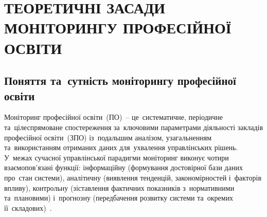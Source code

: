 %
%

\section{\texorpdfstring{\MakeUppercase{Теоретичні засади моніторингу професійної освіти}}{Теоретичні засади моніторингу професійної освіти}}
\label{sec:rozdil1}

\subsection{Поняття та~сутність моніторингу професійної освіти}
\label{sec:p1-theory}
\label{sec:p1-descriptive}

Моніторинг професійної освіти~(ПО)~-- це~систематичне, періодичне та~цілеспрямоване спостереження за~ключовими параметрами діяльності закладів професійної освіти~(ЗПО) із~подальшим аналізом, узагальненням та~використанням отриманих даних для~ухвалення управлінських рішень. У~межах сучасної управлінської парадигми моніторинг виконує чотири взаємопов'язані функції: інформаційну (формування достовірної бази даних про~стан системи), аналітичну (виявлення тенденцій, закономірностей і~факторів впливу), контрольну (зіставлення фактичних показників з~нормативними та~плановими) і~прогнозну (передбачення розвитку системи та~окремих її~складових)~\cite{Bieliaieva2020InfoMech, Penkin2025QAWar}.

